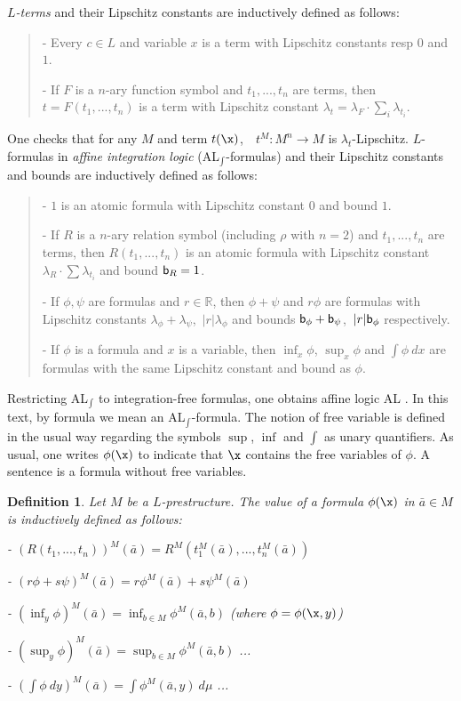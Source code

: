 \documentclass[12pt]{article}
\newtheorem{definition}[theorem]{Definition}
\def\a{\bar {a}}\def\b{\bar {b}}\def\c{\bar {c}}
\def\Rn{\mathbb R}
\begin{document}
\emph{$L$-terms} and their Lipschitz constants are inductively defined as follows:

\begin{quote}
- Every $c\in L$ and variable $x$ is a term with Lipschitz constants resp $0$ and $1$.

- If $F$ is a $n$-ary function symbol and $t_1,...,t_n$ are terms, then $t=F(t_1,...,t_n)$ is a
term with Lipschitz constant $\lambda_t=\lambda_F\cdot\sum_i\lambda_{t_i}$.
\end{quote}
One checks that for any $M$ and term $t(\x)$,\ \ $t^M:M^n\rightarrow M$ is $\lambda_t$-Lipschitz.
$L$-formulas in \emph{affine integration logic} (AL$_{\int}$-formulas) and their Lipschitz constants and bounds
are inductively defined as follows:

\begin{quote}
- $1$ is an atomic formula with Lipschitz constant $0$ and bound $1$.

- If $R$ is a $n$-ary relation symbol (including $\rho$ with $n=2$) and $t_1,...,t_n$ are terms,
then $R(t_1,...,t_n)$ is an atomic formula with Lipschitz constant
$\lambda_R\cdot\sum\lambda_{t_i}$ and bound ${\sf{b}}_R=1$.

- If $\phi,\psi$ are formulas and $r\in\Rn$, then $\phi+\psi$ and $r\phi$ are formulas
with Lipschitz constants $\lambda_\phi+\lambda_\psi$,\ $|r|\lambda_\phi$ and bounds
${\sf{b}}_{\phi}+{\sf{b}}_\psi$,\ $|r|{\sf{b}}_\phi$ respectively.

- If $\phi$ is a formula and $x$ is a variable, then $\inf_x\phi$, $\sup_x\phi$ and $\int\phi\ dx$
are formulas with the same Lipschitz constant and bound as $\phi$.
\end{quote}
\vspace{2mm}

Restricting AL$_{\int}$ to integration-free formulas, one obtains affine logic AL \cite{ACMT}.
In this text, by formula we mean an AL$_{\int}$-formula.
The notion of free variable is defined in the usual way
regarding the symbols $\sup$, $\inf$ and $\int$ as unary quantifiers.
As usual, one writes $\phi(\x)$ to indicate that $\x$ contains the free variables of $\phi$.
A sentence is a formula without free variables.

\begin{definition}
{\em Let $M$ be a $L$-prestructure. The value of a formula $\phi(\x)$ in $\a\in M$ is inductively defined as follows:

- $(R(t_1,...,t_n))^M(\a)=R^M(t^M_1(\a),...,t_n^M(\a))$

- $(r\phi+s\psi)^M(\a)=r\phi^M(\a)+s\psi^M(\a)$

- $(\inf_y\phi)^M(\a)=\inf_{b\in M}\phi^M(\a,b)$\hspace{11mm} (where $\phi=\phi(\x,y)$)

- $(\sup_y\phi)^M(\a)=\sup_{b\in M}\phi^M(\a,b)$ \hspace{25mm} ...

- $(\int\phi\ dy)^M(\a)=\int\phi^M(\a,y)\ d\mu$ \hspace{28mm} ...}
\end{definition}
\end{document}
